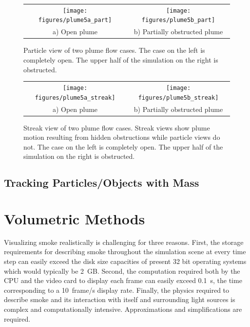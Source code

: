 \documentclass[11pt,twoside]{book}
\newcommand{\figoptions}{htp}
\begin{document}
\begin{figure}[\figoptions]
\begin{center}
\begin{tabular}{cc}
\texttt{[image: figures/plume5a\_part]}&
\texttt{[image: figures/plume5b\_part]}\\
a) Open plume&b) Partially obstructed plume\\
\end{tabular}
\end{center}
\caption[Particle view of two plume flow cases.]
{Particle view of two plume flow cases.  The case on the left
is completely open.  The upper half of the simulation on the right is obstructed.
  }
\label{figpart}%
\end{figure}

\begin{figure}[\figoptions]
\begin{center}
\begin{tabular}{cc}
\texttt{[image: figures/plume5a\_streak]}&
 \texttt{[image: figures/plume5b\_streak]}\\
a) Open plume&b) Partially obstructed plume\\
\end{tabular}
\end{center}
\caption[Streak view of two plume flow cases.  Streak views show plume motion
resulting from hidden obstructions while particle views do not.]
{Streak view of two plume flow cases.  Streak views show plume motion
resulting from hidden obstructions while particle views do not.  The case on the left
is completely open.  The upper half of the simulation on the right is obstructed.
  }
\label{figstreak}%
\end{figure}

\subsection{Tracking Particles/Objects with Mass}

%
%

\section{Volumetric Methods}
Visualizing smoke realistically is challenging for three reasons.
First, the storage requirements for describing smoke throughout the
simulation scene at every time step can easily exceed the disk
size capacities of present 32 bit operating systems which would
typically be 2~GB. Second, the computation required both by the CPU and
the video card to display each frame can easily exceed 0.1~s, the
time corresponding to a 10~frame/s display rate. Finally, the physics
required to describe smoke and its interaction with itself and
surrounding light sources is complex and computationally
intensive. Approximations and simplifications are required.
\end{document}
